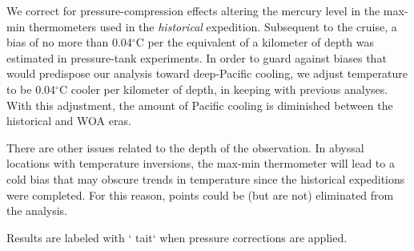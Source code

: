 \documentclass[12pt]{article}
\begin{document}
We correct for pressure-compression effects altering the mercury level
in the max-min thermometers used in the {\it historical} expedition.
Subsequent to the cruise, a bias of no more than 0.04$^\circ$C per the
equivalent of a kilometer of depth was estimated in pressure-tank
experiments\cite{Tait--1882:Pressure}. In order to guard against
biases that would predispose our analysis toward deep-Pacific cooling,
we adjust temperature to be 0.04$^\circ$C cooler per kilometer of
depth, in keeping with previous
analyses\cite{Roemmich-Gould-2012:135}. With this adjustment, the
amount of Pacific cooling is diminished between the historical and WOA
eras.

There are other issues related to the depth of the observation.  In
abyssal locations with temperature inversions, the max-min thermometer
will lead to a cold bias that may obscure trends in temperature since
the historical expeditions were completed. For this reason, points
could be (but are not) eliminated from the analysis.

Results are labeled with ` tait` when pressure corrections are
applied. 

\newpage







\clearpage





\end{document}
